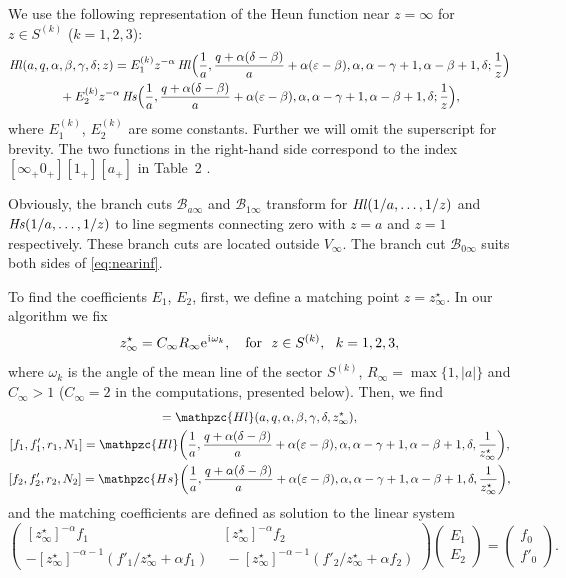 \documentclass[11pt]{article}
\newcommand{\MF}[1]{\mathop{#1}\nolimits}
\newcommand{\ii}{\kern0.05em\mathrm{i}\kern0.05em} \newcommand{\E}[1]{\textrm{e}^{#1}}
\newcommand{\SectInf}{S}%
\newcommand{\BCzero}{\mathscr{B}_{0\infty}}%
\newcommand{\BCone}{\mathscr{B}_{1\infty}}%
\newcommand{\BCa}{\mathscr{B}_{a\infty}}
\def\HeunL{\MF{\textit{Hl\/}}}%
\def\HeunS{\MF{\textit{Hs\/}}}%
\def\psHeunLfin{\mathpzc{Hl}}%
\def\psHeunSfin{\mathpzc{Hs}}%
\def\midpoint#1{z^\star_{#1}}%
\begin{document}
We use the following representation of the Heun function near $z=\infty$ for
$z\in\SectInf^{(k)}$ ($k=1, 2, 3$):
\begin{multline}
\HeunL(a,q,\alpha,\beta,\gamma,\delta;z) = E^{(k)}_1 z^{-\alpha}
\HeunL\Bigl(\frac{1}{a},\frac{q+\alpha(\delta-\beta)}{a}+
\alpha(\varepsilon-\beta),\alpha,\alpha-\gamma+1,\alpha-\beta+1,\delta;\frac{1}{z}\Bigr)
\\ {}+E^{(k)}_2 z^{-\alpha}
\HeunS\Bigl(\frac{1}{a},\frac{q+\alpha(\delta-\beta)}{a}+
\alpha(\varepsilon-\beta),\alpha,\alpha-\gamma+1,\alpha-\beta+1,\delta;\frac{1}{z}\Bigr),
\label{eq:nearinf}
\end{multline}
where $E^{(k)}_1$, $E^{(k)}_2$ are some constants. Further we will omit the
superscript for brevity. The two functions in the right-hand side correspond to
the index $[\infty_+0_+][1_+][a_+]$ in Table~2 \cite{192-Maier2007}.

Obviously, the branch cuts $\BCa$ and $\BCone$ transform for
$\HeunL(1/a,\ldots,1/z)$ and $\HeunS(1/a,\ldots,1/z)$ to line segments
connecting zero with $z=a$ and $z=1$ respectively. These branch cuts are located
outside $V_\infty$. The branch cut $\BCzero$ suits both sides of \eqref{eq:nearinf}.

To find the coefficients $E_1$, $E_2$, first, we define a matching point
$z=\midpoint{\infty}$. In our algorithm we fix
\[
\midpoint{\infty} = C_\infty R_\infty \E{\ii\omega_k}, \quad\mbox{for}\ \
z\in\SectInf^{(k)},\ \ k=1,2,3,
\]
where $\omega_k$ is the angle of the mean line of the sector $\SectInf^{(k)}$,
$R_\infty=\max\{1,|a|\}$ and $C_\infty>1$ ($C_\infty=2$ in the computations,
presented below). Then, we find
\begin{gather*}
 [f_0,f'_0,r_0,N_0]=\psHeunLfin(a,q,\alpha,\beta,\gamma,\delta,\midpoint{\infty}),\\
 [f_1,f'_1,r_1,N_1]=\psHeunLfin\biggl(\frac{1}{a},\frac{q+\alpha(\delta-\beta)}{a}+
\alpha(\varepsilon-\beta),\alpha,\alpha-\gamma+1,\alpha-\beta+1,\delta,\frac{1}{\midpoint{\infty}}\biggr),\\
 [f_2,f'_2,r_2,N_2]=\psHeunSfin\biggl(\frac{1}{a},\frac{q+\alpha(\delta-\beta)}{a}+
\alpha(\varepsilon-\beta),\alpha,\alpha-\gamma+1,\alpha-\beta+1,\delta,\frac{1}{\midpoint{\infty}}\biggr),
\end{gather*}
and the matching coefficients are defined as solution to the linear system
\begin{equation*}
\left(\begin{matrix} [\midpoint{\infty}]^{-\alpha}f_1 &
[\midpoint{\infty}]^{-\alpha}f_2\\[2mm] -[\midpoint{\infty}]^{-\alpha-1}
(f'_1/\midpoint{\infty}+\alpha f_1) ~&~ -[\midpoint{\infty}]^{-\alpha-1}
(f'_2/\midpoint{\infty}+\alpha f_2)
\end{matrix}\right)
\left(\begin{matrix} E_1\\[2mm]E_2
\end{matrix}\right)=
\left(\begin{matrix} f_0\\[2mm]f'_0
\end{matrix}\right).
\end{equation*}
\end{document}
